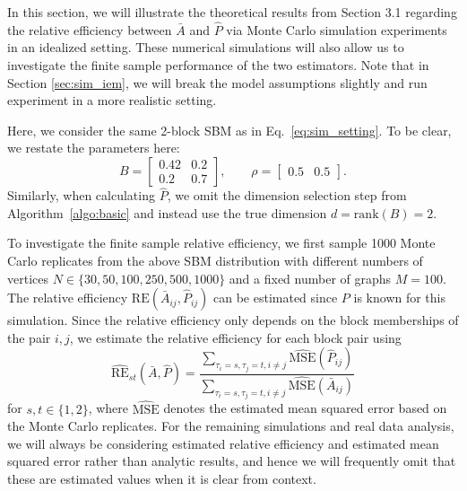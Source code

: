 \documentclass[10pt,letterpaper]{article}
\renewcommand{\hat}{\widehat}
\begin{document}
In this section, we will illustrate the theoretical results from Section 3.1 regarding the relative efficiency between $\bar{A}$ and $\hat{P}$ via Monte Carlo simulation experiments in an idealized setting.
These numerical simulations will also allow us to investigate the finite sample performance of the two estimators.
Note that in Section \ref{sec:sim_iem}, we will break the model assumptions slightly and run experiment in a more realistic setting.

Here, we consider the same 2-block SBM as in Eq.~\ref{eq:sim_setting}. To be clear, we restate the parameters here:
\begin{equation*}
B = \begin{bmatrix}
0.42 & 0.2 \\
0.2 & 0.7
\end{bmatrix}
,\qquad \rho = \begin{bmatrix}
0.5 & 0.5
\end{bmatrix}.
\end{equation*}
Similarly, when calculating $\hat{P}$, we omit the dimension selection step from Algorithm~\ref{algo:basic} and instead use the true dimension $d = \mathrm{rank}(B) = 2$.

To investigate the finite sample relative efficiency, we first sample 1000 Monte Carlo replicates from the above SBM distribution with different numbers of vertices $N \in \{30, 50, 100, 250, 500, 1000 \}$ and a fixed number of graphs $M = 100$. The  relative efficiency $\mathrm{RE}(\bar{A}_{ij}, \hat{P}_{ij})$ can be estimated since $P$ is known for this simulation. Since the relative efficiency only depends on the block memberships of the pair $i,j$, we estimate the relative efficiency for each block pair using
\[
    \hat{\mathrm{RE}}_{st}(\bar{A},\hat{P}) = \frac{\sum_{\tau_i=s,\tau_j=t,i \ne j} \hat{\mathrm{MSE}}(\hat{P}_{ij})}{\sum_{\tau_i=s,\tau_j=t,i \ne j} \hat{\mathrm{MSE}}(\bar{A}_{ij})}
\]
for $s,t\in\{1,2\}$, where $\hat{\mathrm{MSE}}$ denotes the estimated mean squared error based on the Monte Carlo replicates.
For the remaining simulations and real data analysis, we will always be considering estimated relative efficiency and estimated mean squared error rather than analytic results, and hence we will frequently omit that these are estimated values when it is clear from context.
\end{document}
